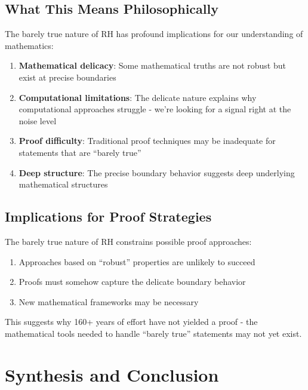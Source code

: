 \subsection{What This Means Philosophically}
\label{subsec:philosophical_meaning}

The barely true nature of RH has profound implications for our understanding of mathematics:

\begin{enumerate}
\item \textbf{Mathematical delicacy}: Some mathematical truths are not robust but exist at precise boundaries

\item \textbf{Computational limitations}: The delicate nature explains why computational approaches struggle - we're looking for a signal right at the noise level

\item \textbf{Proof difficulty}: Traditional proof techniques may be inadequate for statements that are ``barely true''

\item \textbf{Deep structure}: The precise boundary behavior suggests deep underlying mathematical structures
\end{enumerate}

\subsection{Implications for Proof Strategies}
\label{subsec:proof_strategy_implications}

\begin{theorem}
The barely true nature of RH constrains possible proof approaches:
\begin{enumerate}
\item Approaches based on ``robust'' properties are unlikely to succeed
\item Proofs must somehow capture the delicate boundary behavior
\item New mathematical frameworks may be necessary
\end{enumerate}
\end{theorem}

This suggests why 160+ years of effort have not yielded a proof - the mathematical tools needed to handle ``barely true'' statements may not yet exist.

\section{Synthesis and Conclusion}
\label{sec:synthesis}

